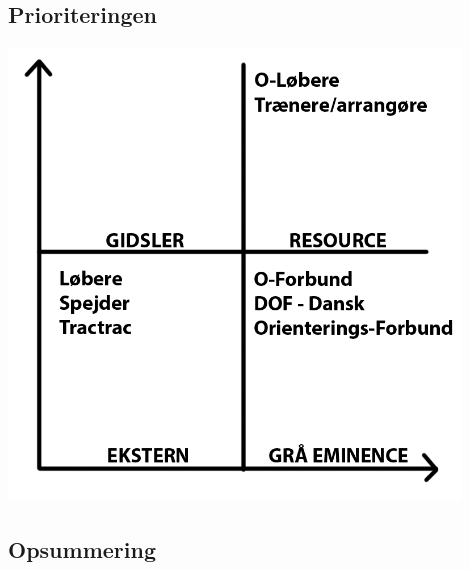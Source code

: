 \subsection{Prioriteringen}

\includegraphics[width=0.90\textwidth]{billeder/Medvirken-indflydelse}
\vspace{4cm}

\subsection{Opsummering}


